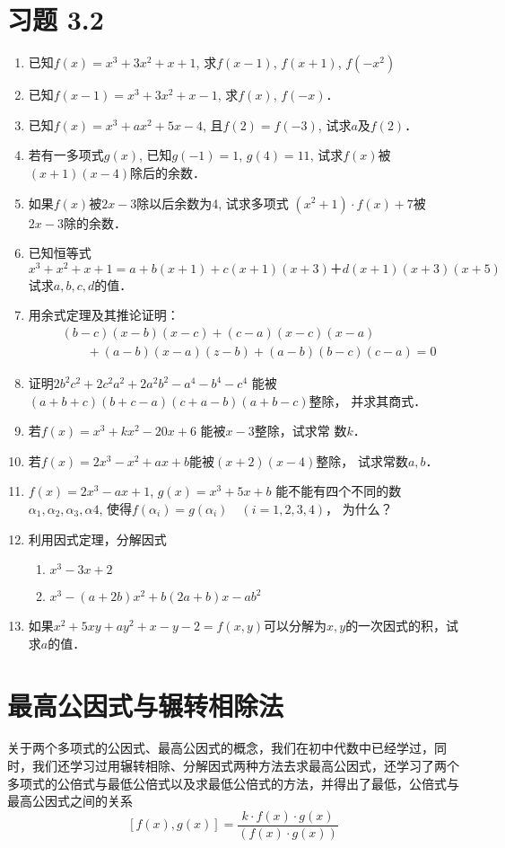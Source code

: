 \section*{习题 3.2}
\begin{enumerate}
    \item 
已知$f(x)=x^3+3x^2+x+1$, 求$f(x-1)$, $f(x+1)$, $f (-x^2)$
\item 已知$f(x-1)=x^3+3x^2+x-1$, 求$f(x)$, $f(-x)$．
\item 已知$f(x)=x^3+ax^2+5x-4$, 且$f(2)=f(-3)$, 试求$a$及$f(2)$．
\item 若有一多项式$g(x)$, 已知$g(-1)=1$, $g(4)=11$, 试求$f(x)$被$(x+1)(x-4)$除后的余数．

\item 如果$f(x)$被$2x-3$除以后余数为4, 试求多项式
$(x^2+1)\cdot f(x)+7$被$2x-3$除的余数．
\item 已知恒等式
\[x^3+x^2+x+1=a+b (x+1) +c (x+1) (x+3)＋d (x+1) (x+3)(x+5)\]
试求$a,b,c,d$的值．
\item 用余式定理及其推论证明：
\[\begin{split}
   & (b-c) (x-b)(x-c)+(c-a)(x-c)(x-a)\\
&\qquad + (a-b) (x-a)(z-b)+(a-b)(b - c)(c-a)=0
\end{split}\]
\item 证明$2b^2c^2+2c^2a^2+2a^2b^2-a^4-b^4-c^4$ 能被$(a+b+c)(b+c-a)(c+a-b)(a+b-c)$整除，
并求其商式．
\item 若$f(x)=x^3+kx^2-20x+6$ 能被$x-3$整除，试求常
数$k$．
\item 若$f(x)=2x^3-x^2+ax+b$能被$(x+2)(x-4)$整除，
试求常数$a,b$．
\item $f(x)=2x^3-ax+1$, $g(x)=x^3+5x+b$ 能不能有四个不同的数$\alpha_1,\alpha_2,\alpha_3,\alpha4$, 使得$f (\alpha_i) =g (\alpha_i)\quad  (i=1,2,3,4)$，
为什么？
\item 利用因式定理，分解因式
\begin{enumerate}
    \item $x^3-3x+2$
    \item $x^3-(a+2b)x^2+b(2a+b)x-ab^2$
\end{enumerate}

\item 如果$x^2+5xy+ay^2+x-y-2=f(x,y)$可以分解为$x,y$的一次因式的积，试求$a$的值．
\end{enumerate}

\section{最高公因式与辗转相除法}
关于两个多项式的公因式、最高公因式的概念，我们在初中代数中已经学过，同时，我们还学习过用辗转相除、分解因式两种方法去求最高公因式，还学习了两个多项式的公倍式与最低公倍式以及求最低公倍式的方法，并得出了最低，公倍式与最高公因式之间的关系
\[[f(x),g(x)]=\frac{k\cdot f(x)\cdot g(x)}{(f(x)\cdot g(x))}\]

